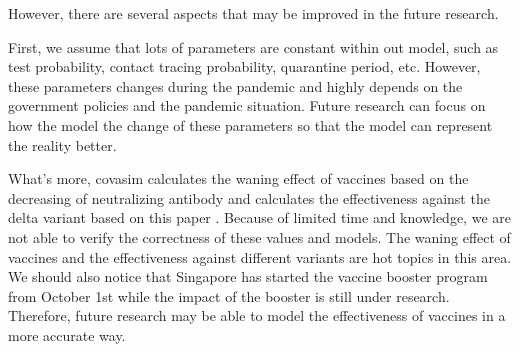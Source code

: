 However, there are several aspects that may be improved in the future research.

First, we assume that lots of parameters are constant within out model, such as test probability, contact tracing probability, quarantine period, etc. However, these parameters changes during the pandemic and highly depends on the government policies and the pandemic situation. Future research can focus on how the model the change of these parameters so that the model can represent the reality better.

What's more, covasim calculates the waning effect of vaccines based on the decreasing of neutralizing antibody \cite{khoury2021level} and calculates the effectiveness against the delta variant based on this paper \cite{mlcochova2021sars}. Because of limited time and knowledge, we are not able to verify the correctness of these values and models. The waning effect of vaccines and the effectiveness against different variants are hot topics in this area. We should also notice that Singapore has started the vaccine booster program from October 1st while the impact of the booster is still under research. Therefore, future research may be able to model the effectiveness of vaccines in a more accurate way.